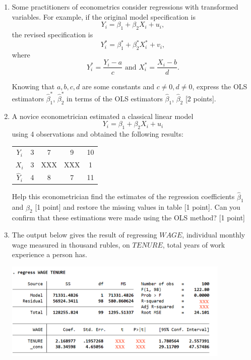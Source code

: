 \begin{enumerate}
    \item Some practitioners of econometrics consider regressions with transformed variables. 
    For example, if the original model specification is
\[
    Y_i = \beta_1 + \beta_2 X_i + u_i,
\]
the revised specification is
\[
    Y_i^* = \beta_1^* + \beta_2^* X_i^* + v_i,
\]
where
\[
    Y_i^* = \frac{Y_i - a}{c} \text{ and } X_i^* = \frac{X_i - b}{d}.
\]

Knowing that $a, b, c, d$ are some constants and $ c \ne 0, d \ne 0$, express the OLS estimators $\hat\beta_1^*$, $\hat\beta_2^*$ 
in terms of the OLS estimators $\hat\beta_1$, $\hat\beta_2$ [2 points].


\item A novice econometrician estimated a classical linear model 
\[
     Y_i = \beta_1 + \beta_2 X_i + u_i
\]
using 4 observations and obtained the following results:

\begin{tabular}{@{}ccccc@{}}
\toprule
 $Y_i$ & 3 & 7 & 9 & 10\\ 
 $X_i$ & 3 & XXX & XXX & 1\\ 
 $\hat Y_i$ & 4 & 8 & 7 & 11\\ 
\bottomrule
\end{tabular}

Help this econometrician find the estimates of the regression coefficients $\hat \beta_1$ and $\hat \beta_2$ [1 point] and restore the missing values in table [1 point]. 
Can you confirm that these estimations were made using the OLS method? [1 point]

\item 
The output below gives the result of regressing $WAGE$, individual monthly wage measured in thousand rubles, on $TENURE$, total years of work experience a person has.

\begin{minipage}{\textwidth}
    \includegraphics[width=0.85\textwidth]{figures/2021-2022_tests_stata-b.png}
\end{minipage}



\end{enumerate}
